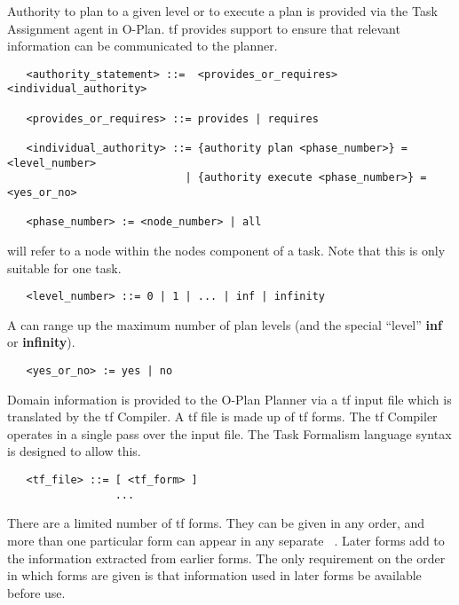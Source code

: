 Authority to plan to a given level or to execute a plan is provided via the
Task Assignment agent in O-Plan.  {\sc tf} provides support to ensure that
relevant information can be communicated to the planner.

\begin{verbatim}
   <authority_statement> ::=  <provides_or_requires> <individual_authority>

   <provides_or_requires> ::= provides | requires

   <individual_authority> ::= {authority plan <phase_number>} = <level_number>
                            | {authority execute <phase_number>} = <yes_or_no>

   <phase_number> := <node_number> | all
\end{verbatim}

 will refer to a node within the nodes component of a task.
Note that this is only suitable for one task.

\begin{verbatim}
   <level_number> ::= 0 | 1 | ... | inf | infinity
\end{verbatim}

A  can range up the maximum number of plan levels
(and the special ``level'' {\bf inf} or {\bf infinity}).

\begin{verbatim}
   <yes_or_no> := yes | no
\end{verbatim}


Domain information is provided to the O-Plan Planner via a {\sc tf} input file
which is translated by the {\sc tf} Compiler.  A {\sc tf} file is
made up of {\sc tf} forms.  The {\sc tf} Compiler operates in a single pass
over the input file.  The Task Formalism language syntax is designed to
allow this.

\begin{verbatim}
   <tf_file> ::= [ <tf_form> ]
                 ...
\end{verbatim}

There are a limited number of {\sc tf} forms.  They can be given in any order,
and more than one particular form can appear in any separate {\tt
{}}.  Later forms add to the information extracted from earlier
forms.  The only requirement on the order in which forms are given is that
information used in later forms be available before use.

